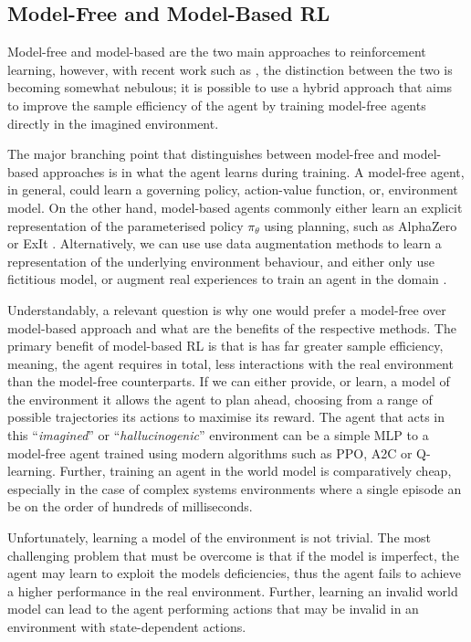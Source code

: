 \subsection{Model-Free and Model-Based RL}

Model-free and model-based are the two main approaches to reinforcement learning, however, with recent work such as \cite{app10196685, kaiser2020modelbased, robine2021smaller}, the distinction between the two is becoming somewhat nebulous; it is possible to use a hybrid approach that aims to improve the sample efficiency of the agent by training model-free agents directly in the imagined environment.

The major branching point that distinguishes between model-free and model-based approaches is in what the agent learns during training. A model-free agent, in general, could learn a governing policy, action-value function, or, environment model. On the other hand, model-based agents commonly either learn an explicit representation of the parameterised policy $\pi_\theta$ using planning, such as AlphaZero \cite{silver2017mastering} or ExIt \cite{anthony2017thinking}. Alternatively, we can use use data augmentation methods to learn a representation of the underlying environment behaviour, and either only use fictitious model, or augment real experiences to train an agent in the domain \cite{kaiser2020modelbased, feinberg2018modelbased, freeman2019learning}.

Understandably, a relevant question is why one would prefer a model-free over model-based approach and what are the benefits of the respective methods. The primary benefit of model-based RL is that is has far greater sample efficiency, meaning, the agent requires in total, less interactions with the real environment than the model-free counterparts. If we can either provide, or learn, a model of the environment it allows the agent to plan ahead, choosing from a range of possible trajectories its actions to maximise its reward. The agent that acts in this ``\textit{imagined}'' or ``\textit{hallucinogenic}'' environment can be a simple MLP \cite{ha2018worldmodels} to a model-free agent trained using modern algorithms such as PPO, A2C or Q-learning. Further, training an agent in the world model is comparatively cheap, especially in the case of complex systems environments where a single episode an be on the order of hundreds of milliseconds.

Unfortunately, learning a model of the environment is not trivial. The most challenging problem that must be overcome is that if the model is imperfect, the agent may learn to exploit the models deficiencies, thus the agent fails to achieve a higher performance in the real environment. Further, learning an invalid world model can lead to the agent performing actions that may be invalid in an environment with state-dependent actions.

